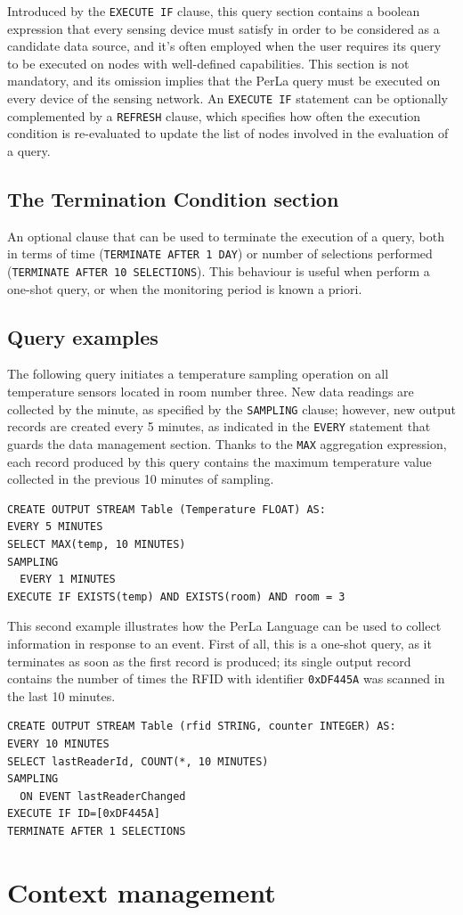 Introduced by the \texttt{EXECUTE IF} clause, this query section contains a
boolean expression that every sensing device must satisfy in order to be
considered as a candidate data source, and it's often employed when the user
requires its query to be executed on nodes with well-defined capabilities. This
section is not mandatory, and its omission implies that the PerLa query must be
executed on every device of the sensing network. An \texttt{EXECUTE IF}
statement can be optionally complemented by a \texttt{REFRESH} clause, which
specifies how often the execution condition is re-evaluated to update the list
of nodes involved in the evaluation of a query. 

\subsection{The Termination Condition section}

An optional clause that can be used to terminate the execution of a query, both
in terms of time (\lstinline!TERMINATE AFTER 1 DAY!) or number of selections
performed (\lstinline!TERMINATE AFTER 10 SELECTIONS!). This behaviour is useful
when perform a one-shot query, or when the monitoring period is known a priori.

\subsection{Query examples}

The following query initiates a temperature sampling operation on all
temperature sensors located in room number three. New data readings are
collected by the minute, as specified by the \texttt{SAMPLING} clause; however,
new output records are created every 5 minutes, as indicated in the
\texttt{EVERY} statement that guards the data management section. Thanks to the
\texttt{MAX} aggregation expression, each record produced by this query
contains the maximum temperature value collected in the previous 10 minutes of
sampling.

\begin{lstlisting}
CREATE OUTPUT STREAM Table (Temperature FLOAT) AS:
EVERY 5 MINUTES
SELECT MAX(temp, 10 MINUTES)
SAMPLING
  EVERY 1 MINUTES
EXECUTE IF EXISTS(temp) AND EXISTS(room) AND room = 3
\end{lstlisting}


This second example illustrates how the PerLa Language can be used to collect
information in response to an event. First of all, this is a one-shot query, as
it terminates as soon as the first record is produced; its single output record
contains the number of times the RFID with identifier \texttt{0xDF445A} was
scanned in the last 10 minutes.

\begin{lstlisting}
CREATE OUTPUT STREAM Table (rfid STRING, counter INTEGER) AS:
EVERY 10 MINUTES
SELECT lastReaderId, COUNT(*, 10 MINUTES)
SAMPLING
  ON EVENT lastReaderChanged
EXECUTE IF ID=[0xDF445A]
TERMINATE AFTER 1 SELECTIONS
\end{lstlisting}


\section{Context management}


